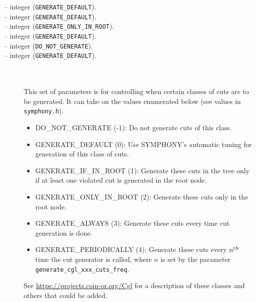 \begin{description}
\item[ -- integer ({\tt GENERATE\_DEFAULT}).] 
\item[ -- integer ({\tt GENERATE\_DEFAULT}).] 
\item[ -- integer ({\tt GENERATE\_ONLY\_IN\_ROOT}).] 
\item[ -- integer ({\tt GENERATE\_DEFAULT}).] 
\item[ -- integer ({\tt DO\_NOT\_GENERATE}).] 
\item[ -- integer ({\tt GENERATE\_DEFAULT}).] 
\ \\ \ \\
This set of parameters is for controlling when certain classes of cuts are to
be generated. It can take on the values enumerated below (see values
in \texttt{symphony.h}).
\begin{itemize}
\item DO\_NOT\_GENERATE (-1): Do not generate cuts of this class.
\item GENERATE\_DEFAULT (0): Use SYMPHONY's automatic tuning for generation of
this class of cuts.
\item GENERATE\_IF\_IN\_ROOT (1): Generate these cuts in the tree only if at
least one violated cut is generated in the root node.    
\item GENERATE\_ONLY\_IN\_ROOT (2): Generate these cuts only in the root node.
\item GENERATE\_ALWAYS (3): Generate these cuts every time cut generation is
done. 
\item GENERATE\_PERIODICALLY (4): Generate these cuts every $n^{\textrm th}$
time the cut generator is called, where $n$ is set by the parameter
\texttt{generate\_cgl\_xxx\_cuts\_freq}.
\end{itemize}
See \url{https://projects.coin-or.org/Cgl} for a description of these
classes and others that could be added.


\end{description}
